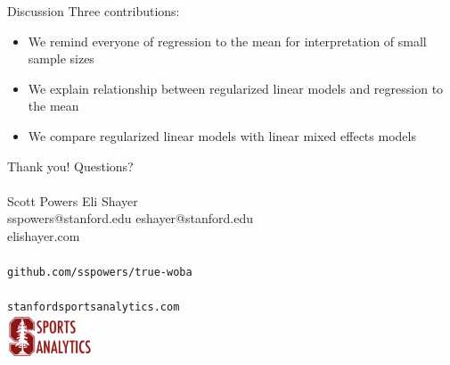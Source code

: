 \documentclass{beamer}
\begin{document}
\begin{frame}{Discussion}
Three contributions:
\begin{itemize}
\item We remind everyone of regression to the mean for interpretation of small
    sample sizes
\item We explain relationship between regularized linear models and regression
    to the mean
\item We compare regularized linear models with linear mixed effects models
\end{itemize}
\end{frame}

\begin{frame}{Thank you!}
\centering
\Huge Questions?\\~\\
\normalsize
Scott Powers            \hfill  Eli Shayer\\
sspowers@stanford.edu   \hfill  eshayer@stanford.edu\\
                        \hfill  elishayer.com\\~\\
{\tt github.com/sspowers/true-woba}\\~\\
{\tt stanfordsportsanalytics.com}\\
\hfill\includegraphics[width = 1in]{../figs/ssac.png}
\end{frame}
\end{document}
